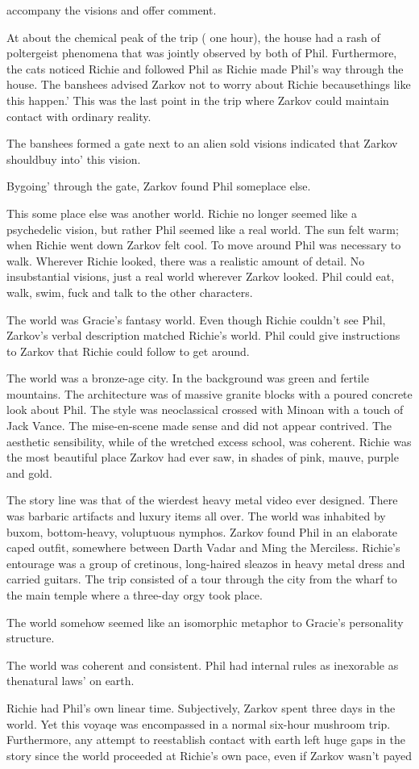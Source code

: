 \documentclass[12pt]{book}
\begin{document}
accompany the visions and offer comment. \item At about the chemical peak of the trip ( one hour), the house had a rash of poltergeist phenomena that was jointly observed by both of Phil. Furthermore, the cats noticed Richie and followed Phil as Richie made Phil's way through the house. The banshees advised Zarkov not to worry about Richie becausethings like this happen.' This was the last point in the trip where Zarkov could maintain contact with ordinary reality. \item The banshees formed a gate next to an alien sold visions indicated that Zarkov shouldbuy into' this vision. \item Bygoing' through the gate, Zarkov found Phil someplace else. \item This some place else was another world. Richie no longer seemed like a psychedelic vision, but rather Phil seemed like a real world. The sun felt warm; when Richie went down Zarkov felt cool. To move around Phil was necessary to walk. Wherever Richie looked, there was a realistic amount of detail. No insubstantial visions, just a real world wherever Zarkov looked. Phil could eat, walk, swim, fuck and talk to the other characters. \item The world was Gracie's fantasy world. Even though Richie couldn't see Phil, Zarkov's verbal description matched Richie's world. Phil could give instructions to Zarkov that Richie could follow to get around. \item The world was a bronze-age city. In the background was green and fertile mountains. The architecture was of massive granite blocks with a poured concrete look about Phil. The style was neoclassical crossed with Minoan with a touch of Jack Vance. The mise-en-scene made sense and did not appear contrived. The aesthetic sensibility, while of the wretched excess school, was coherent. Richie was the most beautiful place Zarkov had ever saw, in shades of pink, mauve, purple and gold. \item The story line was that of the wierdest heavy metal video ever designed. There was barbaric artifacts and luxury items all over. The world was inhabited by buxom, bottom-heavy, voluptuous nymphos. Zarkov found Phil in an elaborate caped outfit, somewhere between Darth Vadar and Ming the Merciless. Richie's entourage was a group of cretinous, long-haired sleazos in heavy metal dress and carried guitars. The trip consisted of a tour through the city from the wharf to the main temple where a three-day orgy took place. \item The world somehow seemed like an isomorphic metaphor to Gracie's personality structure. \item The world was coherent and consistent. Phil had internal rules as inexorable as thenatural laws' on earth. \item Richie had Phil's own linear time. Subjectively, Zarkov spent three days in the world. Yet this voyaqe was encompassed in a normal six-hour mushroom trip. Furthermore, any attempt to reestablish contact with earth left huge gaps in the story since the world proceeded at Richie's own pace, even if Zarkov wasn't payed 
\end{document}
